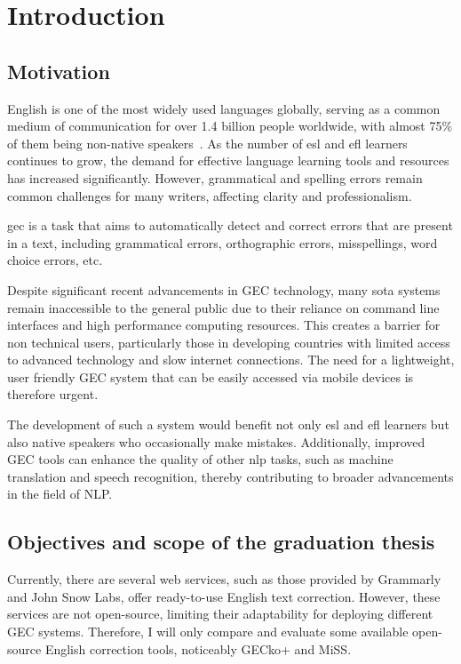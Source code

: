 \chapter{Introduction}
\label{chapter:introduction}

\section{Motivation}
\label{section:motivation}

English is one of the most widely used languages globally, serving as a common medium of communication for over 1.4 billion people worldwide, with almost 75\% of them being non-native speakers~\citep{eberhard2015ethnologue}.
As the number of \acrfull{esl} and \acrfull{efl} learners continues to grow, the demand for effective language learning tools and resources has increased significantly.
However, grammatical and spelling errors remain common challenges for many writers, affecting clarity and professionalism.

\acrfull{gec} is a task that aims to automatically detect and correct errors that are present in a text, including grammatical errors, orthographic errors, misspellings, word choice errors, etc. \citep{ng-etal-2014-conll}

Despite significant recent advancements in GEC technology, many \acrfull{sota} systems remain inaccessible to the general public due to their reliance on command line interfaces and high performance computing resources.
This creates a barrier for non technical users, particularly those in developing countries with limited access to advanced technology and slow internet connections.
The need for a lightweight, user friendly GEC system that can be easily accessed via mobile devices is therefore urgent.

The development of such a system would benefit not only \acrshort{esl} and \acrshort{efl} learners but also native speakers who occasionally make mistakes.
Additionally, improved GEC tools can enhance the quality of other \acrfull{nlp} tasks, such as machine translation and speech recognition, thereby contributing to broader advancements in the field of NLP.

\section{Objectives and scope of the graduation thesis}
\label{section:objective}

Currently, there are several web services, such as those provided by Grammarly and John Snow Labs, offer ready-to-use English text correction.
However, these services are not open-source, limiting their adaptability for deploying different GEC systems.
Therefore, I will only compare and evaluate some available open-source English correction tools, noticeably GECko+ and MiSS.

